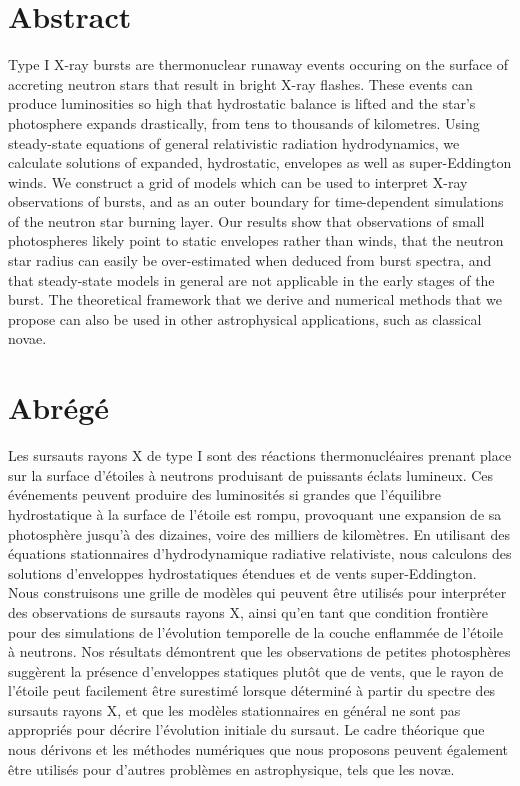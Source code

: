 \documentclass[../main.tex]{subfiles}
\begin{document}
\thispagestyle{empty}
\chapter*{Abstract}
Type I X-ray bursts are thermonuclear runaway events occuring on the surface of accreting neutron stars that result in bright X-ray flashes. These events can produce luminosities so high that hydrostatic balance is lifted and the star's photosphere expands drastically, from tens to thousands of kilometres. Using steady-state equations of general relativistic radiation hydrodynamics, we calculate solutions of expanded, hydrostatic, envelopes as well as super-Eddington winds. We construct a grid of models which can be used to interpret X-ray observations of bursts, and as an outer boundary for time-dependent simulations of the neutron star burning layer. Our results show that observations of small photospheres likely point to static envelopes rather than winds, that the neutron star radius can easily be over-estimated when deduced from burst spectra, and that steady-state models in general are not applicable in the early stages of the burst. The theoretical framework that we derive and numerical methods that we propose can also be used in other astrophysical applications, such as classical novae.

\chapter*{Abrégé}
Les sursauts rayons X de type I sont des réactions thermonucléaires prenant place sur la surface d'étoiles à neutrons produisant de puissants éclats lumineux. Ces événements peuvent produire des luminosités si grandes que l'équilibre hydrostatique à la surface de l'étoile est rompu, provoquant une expansion de sa photosphère jusqu'à des dizaines, voire des milliers de kilomètres. En utilisant des équations stationnaires d'hydrodynamique radiative relativiste, nous calculons des solutions d'enveloppes hydrostatiques étendues et de vents super-Eddington. Nous construisons une grille de modèles qui peuvent être utilisés pour interpréter des observations de sursauts rayons X, ainsi qu'en tant que condition frontière pour des simulations de l'évolution temporelle de la couche enflammée de l'étoile à neutrons. Nos résultats démontrent que les observations de petites photosphères suggèrent la présence d'enveloppes statiques plutôt que de vents, que le rayon de l'étoile peut facilement être surestimé lorsque déterminé à partir du spectre des sursauts rayons X, et que les modèles stationnaires en général ne sont pas appropriés pour décrire l'évolution initiale du sursaut. Le cadre théorique que nous dérivons et les méthodes numériques que nous proposons peuvent également être utilisés pour d'autres problèmes en astrophysique, tels que les nov{\ae}.

\end{document}
